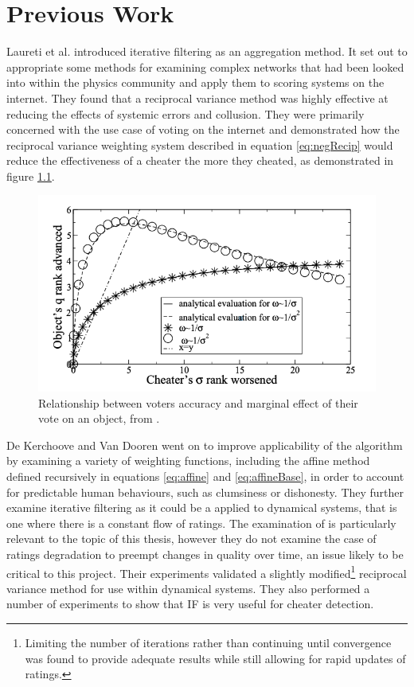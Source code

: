 \chapter{Previous Work}\label{chap:litReview}

Laureti et al. \cite{laureti2006information} introduced iterative filtering as an aggregation method. It set out to appropriate some methods for examining complex networks that had been looked into within the physics community and apply them to scoring systems on the internet. They found that a reciprocal variance method was highly effective at reducing the effects of systemic errors and collusion. They were primarily concerned with the use case of voting on the internet and demonstrated how the reciprocal variance weighting system described in equation \ref{eq:negRecip} would reduce the effectiveness of a cheater the more they cheated, as demonstrated in figure \ref{fig:recipCheating}.

\begin{figure}[H]
    \centering
    \includegraphics{Figures/recipCheating.png}
    \caption[Relationship between voters accuracy and marginal effect of their vote on an object]{Relationship between voters accuracy and marginal effect of their vote on an object, from \textcite{laureti2006information}.}
    \label{fig:recipCheating}
\end{figure}

De Kerchoove and Van Dooren \cite{de2007iterative} went on to improve applicability of the algorithm by examining a variety of weighting functions, including the affine method defined recursively in equations \ref{eq:affine} and \ref{eq:affineBase}, in order to account for predictable human behaviours, such as clumsiness or dishonesty. 
They further examine iterative filtering as it could be a applied to dynamical systems, that is one where there is a constant flow of ratings. The examination of is particularly relevant to the topic of this thesis, however they do not examine the case of ratings degradation to preempt changes in quality over time, an issue likely to be critical to this project.  Their experiments validated a slightly modified\footnote{Limiting the number of iterations rather than continuing until convergence was found to provide adequate results while still allowing for rapid updates of ratings.} reciprocal variance method for use within dynamical systems. They also performed a number of experiments to show that IF is very useful for cheater detection. 

